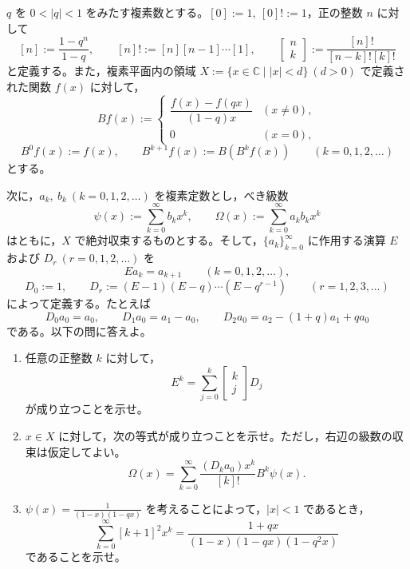 \documentclass[12pt]{jlreq}
\newcommand{\C}{\mathbb{C}}
\begin{document}
\(q\) を \(0<|q|<1\) をみたす複素数とする。\([0]:=1,\ [0]!:=1\)，正の整数 \(n\) に対して
\[
  [n]:=\frac{1-q^n}{1-q},\qquad
  [n]!:=[n][n-1]\cdots[1],\qquad
  \begin{bmatrix}n\\ k\end{bmatrix}:=\frac{[n]!}{[n-k]![k]!}
\]
と定義する。また，複素平面内の領域 \(X:=\{x\in\C\mid |x|<d\}\ (d>0)\) で定義された関数 \(f(x)\) に対して，
\[
  Bf(x):=
  \begin{cases}
    \dfrac{f(x)-f(qx)}{(1-q)x} & (x\ne0),\\
    0 & (x=0),
  \end{cases}
\]
\[
  B^0f(x):=f(x),\qquad
  B^{k+1}f(x):=B(B^kf(x))\qquad (k=0,1,2,\ldots)
\]
とする。

次に，\(a_k,\ b_k\ (k=0,1,2,\ldots)\) を複素定数とし，べき級数
\[
  \psi(x):=\sum_{k=0}^{\infty}b_kx^k,\qquad
  \Omega(x):=\sum_{k=0}^{\infty}a_kb_kx^k
\]
はともに，\(X\) で絶対収束するものとする。そして，\(\{a_k\}_{k=0}^{\infty}\) に作用する演算 \(E\) および \(D_r\ (r=0,1,2,\ldots)\) を
\[
  Ea_k=a_{k+1}\qquad (k=0,1,2,\ldots),
\]
\[
  D_0:=1,\qquad
  D_r:=(E-1)(E-q)\cdots(E-q^{r-1})\qquad (r=1,2,3,\ldots)
\]
によって定義する。たとえば
\[
  D_0a_0=a_0,\qquad
  D_1a_0=a_1-a_0,\qquad
  D_2a_0=a_2-(1+q)a_1+qa_0
\]
である。以下の問に答えよ。

\begin{enumerate}
  \item 任意の正整数 \(k\) に対して，
  \[
    E^k=\sum_{j=0}^{k}\begin{bmatrix}k\\ j\end{bmatrix}D_j
  \]
  が成り立つことを示せ。
  \item \(x\in X\) に対して，次の等式が成り立つことを示せ。ただし，右辺の級数の収束は仮定してよい。
  \[
    \Omega(x)=\sum_{k=0}^{\infty}\frac{(D_ka_0)x^k}{[k]!}B^k\psi(x).
  \]
  \item \(\displaystyle\psi(x)=\frac{1}{(1-x)(1-qx)}\) を考えることによって，\(|x|<1\) であるとき，
  \[
    \sum_{k=0}^{\infty}[k+1]^2x^k=
    \frac{1+qx}{(1-x)(1-qx)(1-q^2x)}
  \]
  であることを示せ。
\end{enumerate}
\end{document}
